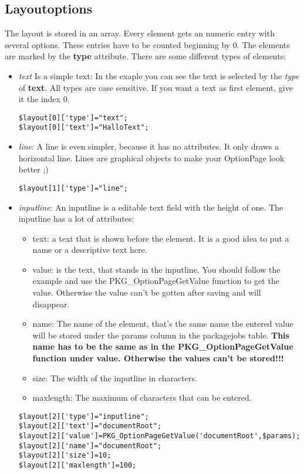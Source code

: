 \subsection{Layoutoptions}
The layout is stored in an array. Every element gets an numeric entry with several options. These entries have to be counted beginning by 0. The elements are marked by the \textbf{type} attribute.
There are some different types of elements:
\begin{itemize}



\item \textit{text} Is a simple text: In the exaple you can see the text is selected by the \textit{type} of \textbf{text}. All types are case sensitive. If you want a text as first element, give it the index 0.
\begin{verbatim}
$layout[0]['type']="text";
$layout[0]['text']="HalloText";
\end{verbatim}


\item \textit{line}: A line is even simpler, because it has no attributes. It only draws a horizontal line. Lines are graphical objects to make your OptionPage look better ;)
\begin{verbatim}
$layout[1]['type']="line";
\end{verbatim}


\item \textit{inputline}: An inputline is a editable text field with the height of one. The inputline has a lot of attributes:
\begin{itemize}
\item text: a text that is shown before the element. It is a good idea to put a name or a descriptive text here.
\item value: is the text, that stands in the inputline. You should follow the example and use the PKG\_OptionPageGetValue function to get the value. Otherwise the value can't be gotten after saving and will disappear.
\item name: The name of the element, that's the same name the entered value will be stored under the params column in the packagejobs table. \textbf{This name has to be the same as in the PKG\_OptionPageGetValue function under value. Otherwise the values can't be stored!!!}
\item size: The width of the inputline in characters.
\item maxlength: The maximum of characters that can be entered.
\end{itemize}
\begin{verbatim}
$layout[2]['type']="inputline";
$layout[2]['text']="documentRoot";
$layout[2]['value']=PKG_OptionPageGetValue('documentRoot',$params);
$layout[2]['name']="documentRoot";
$layout[2]['size']=10;
$layout[2]['maxlength']=100;
\end{verbatim}



\end{itemize}
